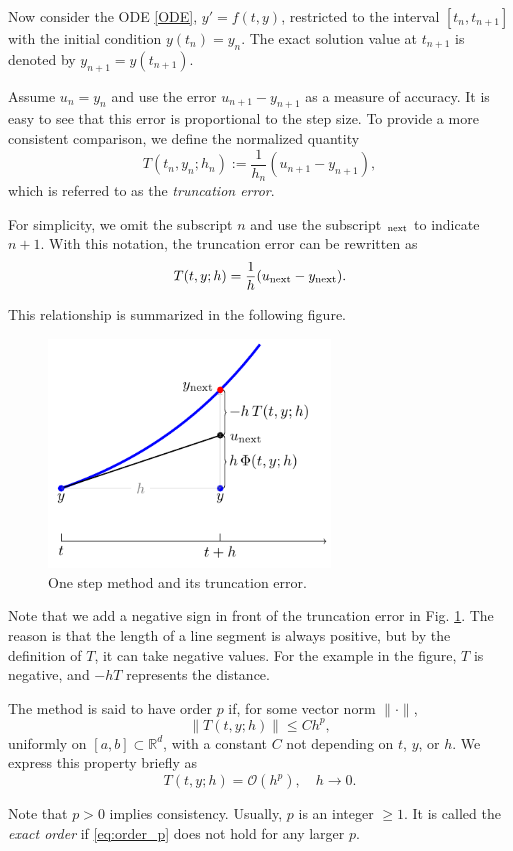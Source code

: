 \documentclass[10pt]{amsart}
\begin{document}
Now consider the ODE \eqref{ODE}, $y' = f(t, y)$, restricted to the interval $[t_n, t_{n+1}]$ with the initial condition $y(t_n) = y_n$. The exact solution value at $t_{n+1}$ is denoted by $y_{n+1} = y(t_{n+1})$.  

Assume $u_n = y_n$ and use the error $u_{n+1} - y_{n+1}$ as a measure of accuracy. It is easy to see that this error is proportional to the step size. To provide a more consistent comparison, we define the normalized quantity  
$$T(t_n, y_n; h_n) := \frac{1}{h_n}(u_{n+1} - y_{n+1}),$$  
which is referred to as the {\em truncation error}.  

For simplicity, we omit the subscript $n$ and use the subscript $_{\rm next}$ to indicate $n+1$. With this notation, the truncation error can be rewritten as  
$$T(t, y; h) = \frac{1}{h}(u_{\rm next} - y_{\rm next}).$$  

This relationship is summarized in the following figure.  

\begin{figure}[htbp]
\begin{center}
\includegraphics[width=7.5cm]{figures/TruncationError.pdf}
\caption{One step method and its truncation error.}
\label{fig:Th}
\end{center}
\end{figure}

Note that we add a negative sign in front of the truncation error in Fig. \ref{fig:Th}. The reason is that the length of a line segment is always positive, but by the definition of $T$, it can take negative values. For the example in the figure, $T$ is negative, and $-hT$ represents the distance.  

\begin{definition}
The method is said to have order $p$ if, for some vector norm $\|\cdot\|$,  
\begin{equation}\label{eq:order_p}
\|T(t, y; h)\| \leq C h^p,  
\end{equation}  
uniformly on $[a, b] \subset \mathbb{R}^d$, with a constant $C$ not depending on $t$, $y$, or $h$.  
We express this property briefly as  
\begin{equation}\label{eq:order_bigO}
T(t, y; h) = \mathcal{O}(h^p), \quad h \to 0.  
\end{equation}  

Note that $p > 0$ implies consistency. Usually, $p$ is an integer $\geq 1$. It is called the \emph{exact order} if \eqref{eq:order_p} does not hold for any larger $p$.  
\end{definition}
\end{document}
